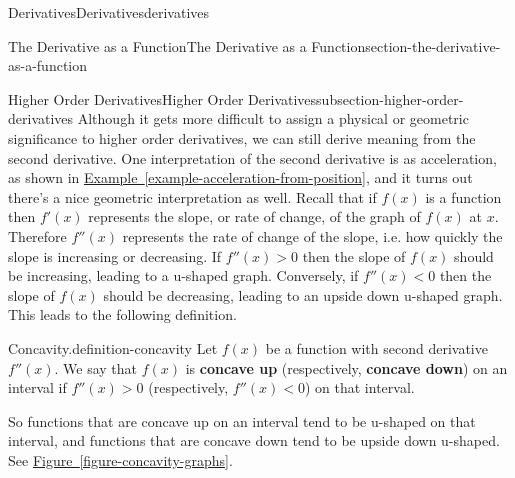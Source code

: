 \documentclass[oneside,10pt,]{book}
\newcommand{\terminology}[1]{\textbf{#1}}
\numberwithin{equation}{section}
\begin{document}
\begin{chapterptx}{Derivatives}{}{Derivatives}{}{}{derivatives}
\begin{sectionptx}{The Derivative as a Function}{}{The Derivative as a Function}{}{}{section-the-derivative-as-a-function}
\begin{subsectionptx}{Higher Order Derivatives}{}{Higher Order Derivatives}{}{}{subsection-higher-order-derivatives}
Although it gets more difficult to assign a physical or geometric significance to higher order derivatives, we can still derive meaning from the second derivative. One interpretation of the second derivative is as acceleration, as shown in \hyperref[example-acceleration-from-position]{Example~\ref{example-acceleration-from-position}}, and it turns out there's a nice geometric interpretation as well. Recall that if \(f(x)\) is a function then \(f'(x)\) represents the slope, or rate of change, of the graph of \(f(x)\) at \(x\). Therefore \(f''(x)\) represents the rate of change of the slope, i.e. how quickly the slope is increasing or decreasing. If \(f''(x) >0\) then the slope of \(f(x)\) should be increasing, leading to a u-shaped graph. Conversely, if \(f''(x) <0\) then the slope of \(f(x)\) should be decreasing, leading to an upside down u-shaped graph. This leads to the following definition.%
\begin{definition}{Concavity.}{definition-concavity}%
\hypertarget{p-121}{}%
Let \(f(x)\) be a function with second derivative \(f''(x)\). We say that \(f(x)\) is \terminology{concave up} (respectively, \terminology{concave down}) on an interval if \(f''(x)>0\) (respectively, \(f''(x) <0\)) on that interval.%
\end{definition}
\hypertarget{p-122}{}%
So functions that are concave up on an interval tend to be u-shaped on that interval, and functions that are concave down tend to be upside down u-shaped. See \hyperref[figure-concavity-graphs]{Figure~\ref{figure-concavity-graphs}}.%
\begin{figure}
\centering
\begin{sidebyside}{2}{0}{0}{0}%
\begin{sbspanel}{0.5}%
\end{sbspanel}%
\begin{sbspanel}{0.5}%
\resizebox{\linewidth}{!}{{
\begin{tikzpicture}

\end{tikzpicture}}}
\end{sbspanel}
\end{sidebyside}
\end{figure}
\end{subsectionptx}
\end{sectionptx}
\end{chapterptx}
\end{document}
